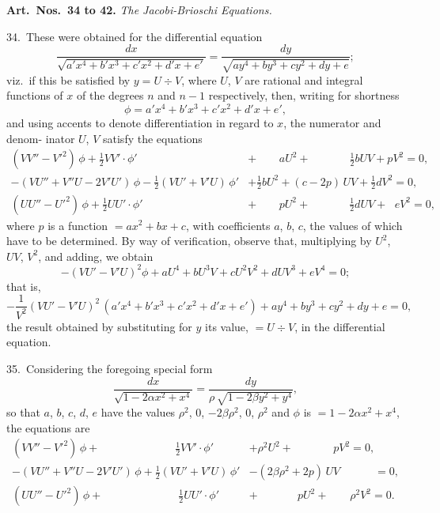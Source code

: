 \documentclass[11pt,a4paper]{book}
\begin{document}
\newpage
\noindent\textbf{Art.\ Nos.\ 34 to 42.} \textit{The Jacobi-Brioschi Equations.}

34.\ These were obtained for the differential equation
\[
\frac{dx}{\sqrt{a'x^4 + b'x^3 + c'x^2 + d'x + e'}}
= \frac{dy}{\sqrt{ay^4 + by^3 + cy^2 + dy + e}};
\]
viz.\ if this be satisfied by $y = U \div V$, where $U$, $V$ are rational and integral functions
of $x$ of the degrees $n$ and $n-1$ respectively, then, writing for shortness
\[
\phi = a'x^4 + b'x^3 + c'x^2 + d'x + e',
\]
and using accents to denote differentiation in regard to $x$, the numerator and denom-
inator $U$, $V$ satisfy the equations
\begin{align*}
(VV'' - V'^2)\, \phi + \tfrac12 VV' \cdot \phi' \phantom{{} + aU^2 \;}
&+ \phantom{(c-{}} aU^2 + \phantom{{}\tfrac12 dUV +{}} \tfrac12 bUV + pV^2 = 0,\\
-(VU'' + V''U - 2V'U')\, \phi - \tfrac12(VU' + V'U)\, \phi'
&+ \tfrac12 bU^2 + (c - 2p)\, UV + \tfrac12 dV^2 = 0,\\
(UU'' - U'^2)\, \phi + \tfrac12 UU' \cdot \phi' \phantom{{} + pU^2 \;}
&+ \phantom{(c-{}} pU^2 + \phantom{{}\tfrac12 dUV +{}} \tfrac12 dUV + \phantom{{}c\,} eV^2 = 0,
\end{align*}
where $p$ is a function $= ax^2 + bx + c$, with coefficients $a$, $b$, $c$, the values of which have
to be determined. By way of verification, observe that, multiplying by $U^2$, $UV$, $V^2$,
and adding, we obtain
\[
-(VU' - V'U)^2 \phi + aU^4 + bU^3V + cU^2V^2 + dUV^3 + eV^4 = 0;
\]
that is,
\[
-\frac{1}{V^2}(VU' - V'U)^2\, (a'x^4 + b'x^3 + c'x^2 + d'x + e')
+ ay^4 + by^3 + cy^2 + dy + e = 0,
\]
the result obtained by substituting for $y$ its value, $= U \div V$, in the differential equation.

35.\ Considering the foregoing special form
\[
\frac{dx}{\sqrt{1 - 2\alpha x^2 + x^4}}
= \frac{dy}{\rho\, \sqrt{1 - 2\beta y^2 + y^4}},
\]
so that $a$, $b$, $c$, $d$, $e$ have the values $\rho^2$, $0$, $-2\beta\rho^2$, $0$, $\rho^2$ and $\phi$ is $= 1 - 2\alpha x^2 + x^4$, the
equations are
\begin{align*}
(VV'' - V'^2)\, \phi + \phantom{{}\tfrac12(VU'+V'U)\,} \tfrac12 VV' \cdot \phi'
&+ \rho^2 U^2 + \phantom{(2\beta\rho^2+{}} pV^2 = 0,\\
-(VU'' + V''U - 2V'U')\, \phi + \tfrac12(VU' + V'U)\, \phi'
&- (2\beta\rho^2 + 2p)\, UV \phantom{{}+ \rho^2V^2} = 0,\\
(UU'' - U'^2)\, \phi + \phantom{{}\tfrac12(VU'+V'U)\,} \tfrac12 UU' \cdot \phi'
&+ \phantom{(2\beta\rho^2+{}} pU^2 + \phantom{{}\rho^2V^2} \rho^2 V^2 = 0.
\end{align*}
\end{document}
